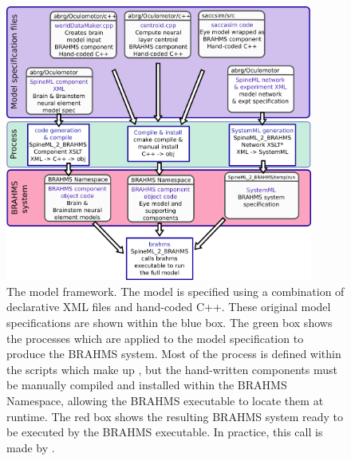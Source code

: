\documentclass{frontiersSCNS}
\begin{document}
\begin{figure}[!ht]
\begin{center}
\includegraphics[width=0.9\textwidth]{./figures/model_framework.png}
\end{center}
\caption{ The model framework. The model is specified using a combination of
declarative XML files and hand-coded C++. These original model
specifications are shown within the blue box.  The green box shows
the processes which are applied to the model specification to produce
the BRAHMS system. Most of the process is defined within the scripts
which make up \stob, but the hand-written components must be manually
compiled and installed within the BRAHMS Namespace, allowing the
BRAHMS executable to locate them at runtime.  The red box shows the
resulting BRAHMS system ready to be executed by the BRAHMS
executable. In practice, this call is made by \stob.}
\label{fig:modelframework}
\end{figure}
\end{document}
